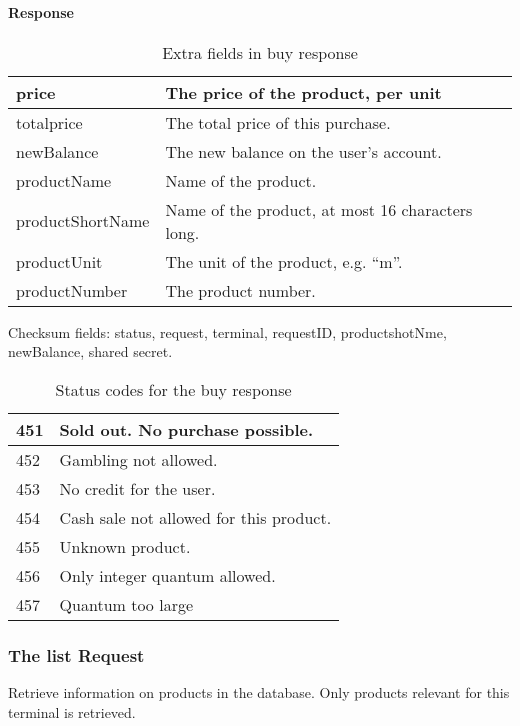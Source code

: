 \documentclass[a4paper,11pt]{article}
\newcommand{\code}[1]
   {\textsf{\mbox{#1}}}
\newcommand{\rightcellwidth}{25em}
\newcommand{\reqsection}[1]
    {\subsubsection{The \code{#1} Request}}
\newcommand{\partsection}[1]
           {\paragraph{#1}}
\begin{document}
\partsection{Response}
\begin{table}[!ht]
  \begin{tabular}{|l|p{\rightcellwidth}|}
    \hline
     price         & The price of the product, per unit\\\hline
     totalprice    & The total price of this purchase.\\\hline
     newBalance    & The new balance on the user's account.\\\hline
     productName   & Name of the product. \\\hline
     productShortName & Name of the product, at most 16 characters long.\\\hline
     productUnit   & The unit of the product, e.g. ``m''. \\\hline
     productNumber & The product number. \\\hline
  \end{tabular} 
  \caption{Extra fields in \code{buy} response}
\end{table}

Checksum fields: status, request, terminal, requestID, productshotNme,
newBalance, shared secret.

\begin{table}[!ht]
  \begin{tabular}{|l|p{\rightcellwidth}|}
    \hline
      451  & Sold out. No purchase possible.\\\hline
      452  & Gambling not allowed.\\\hline
      453  & No credit for the user.\\\hline
      454  & Cash sale not allowed for this product.\\\hline
      455  & Unknown product. \\\hline
      456  & Only integer quantum allowed. \\\hline
      457  & Quantum too large
  \end{tabular} 
  \caption{Status codes for the \code{buy} response}
\end{table}


\reqsection{list}

Retrieve information on products in the database. Only products
relevant for this terminal is retrieved.
\end{document}
